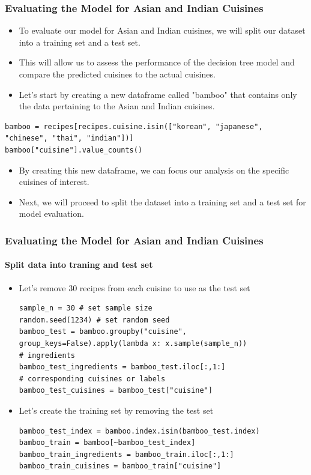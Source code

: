 \documentclass{beamer}
\begin{document}
\begin{frame}[fragile]
	\frametitle{Evaluating the Model for Asian and Indian Cuisines}
	
	\begin{itemize}
		\item To evaluate our model for Asian and Indian cuisines, we will split our dataset into a training set and a test set.
		\item This will allow us to assess the performance of the decision tree model and compare the predicted cuisines to the actual cuisines.
		\item Let's start by creating a new dataframe called "bamboo" that contains only the data pertaining to the Asian and Indian cuisines.
	\end{itemize}
\begin{lstlisting}
bamboo = recipes[recipes.cuisine.isin(["korean", "japanese", "chinese", "thai", "indian"])]
bamboo["cuisine"].value_counts()
\end{lstlisting}

\begin{itemize}
\item By creating this new dataframe, we can focus our analysis on the specific cuisines of interest.
\item Next, we will proceed to split the dataset into a training set and a test set for model evaluation.
\end{itemize}

\end{frame}


\begin{frame}[fragile]
	\frametitle{Evaluating the Model for Asian and Indian Cuisines}
	\framesubtitle{Split data into traning and test set}
	\begin{itemize}
\item  Let's remove 30 recipes from each cuisine to use as the test set
	\begin{lstlisting}
sample_n = 30 # set sample size
random.seed(1234) # set random seed
bamboo_test = bamboo.groupby("cuisine", group_keys=False).apply(lambda x: x.sample(sample_n))
# ingredients
bamboo_test_ingredients = bamboo_test.iloc[:,1:]
# corresponding cuisines or labels 
bamboo_test_cuisines = bamboo_test["cuisine"] 
	\end{lstlisting}
\item Let's create the training set by removing the test set
\begin{lstlisting}
bamboo_test_index = bamboo.index.isin(bamboo_test.index)
bamboo_train = bamboo[~bamboo_test_index]
bamboo_train_ingredients = bamboo_train.iloc[:,1:] 
bamboo_train_cuisines = bamboo_train["cuisine"]
\end{lstlisting}
	\end{itemize}	
\end{frame}
\end{document}
